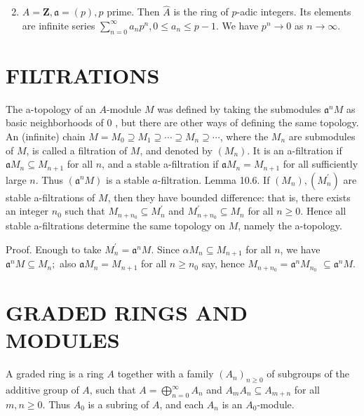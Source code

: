 \documentclass{standalone}
\theoremstyle{definition}
\theoremstyle{remark}
\begin{document}
\begin{enumerate}
  \setcounter{enumi}{1}
  \item $A=\mathbf{Z}, \mathfrak{a}=(p), p$ prime. Then $\hat{A}$ is the ring of $p$-adic integers. Its elements are infinite series $\sum_{n=0}^{\infty} a_{n} p^{n}, 0 \leqslant a_{n} \leqslant p-1$. We have $p^{n} \rightarrow 0$ as $n \rightarrow \infty$.
\end{enumerate}

\section{FILTRATIONS}
The a-topology of an $A$-module $M$ was defined by taking the submodules $\mathfrak{a}^{n} M$ as basic neighborhoods of 0 , but there are other ways of defining the same topology. An (infinite) chain $M=M_{0} \supseteq M_{1} \supseteq \cdots \supseteq M_{n} \supseteq \cdots$, where the $M_{n}$ are submodules of $M$, is called a filtration of $M$, and denoted by $\left(M_{n}\right)$. It is an a-filtration if $\mathfrak{a} M_{n} \subseteq M_{n+1}$ for all $n$, and a stable a-filtration if $\mathfrak{a} M_{n}=M_{n+1}$ for all sufficiently large $n$. Thus $\left(\mathfrak{a}^{n} M\right)$ is a stable $a$-filtration. Lemma 10.6. If $\left(M_{n}\right),\left(M_{n}^{\prime}\right)$ are stable a-filtrations of $M$, then they have bounded difference: that is, there exists an integer $n_{0}$ such that $M_{n+n_{0}} \subseteq M_{n}^{\prime}$ and $M_{n+n_{0}}^{\prime} \subseteq M_{n}$ for all $n \geqslant 0$. Hence all stable a-filtrations determine the same topology on $M$, namely the a-topology.

Proof. Enough to take $M_{n}^{\prime}=\mathfrak{a}^{n} M$. Since $\mathfrak{\alpha} M_{n} \subseteq M_{n+1}$ for all $n$, we have $\mathfrak{a}^{n} M \subseteq M_{n} ;$ also $\mathfrak{a} M_{n}=M_{n+1}$ for all $n \geqslant n_{0}$ say, hence $M_{n+n_{0}}=\mathfrak{a}^{n} M_{n_{0}}$ $\subseteq \mathfrak{a}^{n} M$.

\section{GRADED RINGS AND MODULES}
A graded ring is a ring $A$ together with a family $\left(A_{n}\right)_{n \geq 0}$ of subgroups of the additive group of $A$, such that $A=\bigoplus_{n=0}^{\infty} A_{n}$ and $A_{m} A_{n} \subseteq A_{m+n}$ for all $m, n \geqslant 0$. Thus $A_{0}$ is a subring of $A$, and each $A_{n}$ is an $A_{0}$-module.
\end{document}
